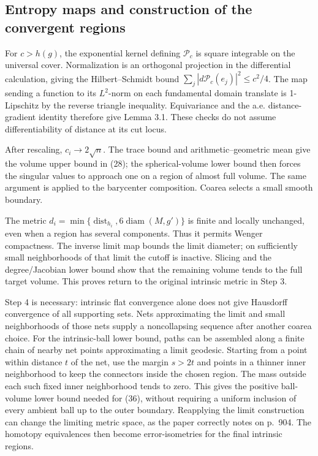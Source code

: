 \documentclass[10pt]{article}
\begin{document}
\subsection*{Entropy maps and construction of the convergent regions}
For \(c>h(g)\), the exponential kernel defining \(\mathcal P_c\) is square integrable on the universal cover. Normalization is an orthogonal projection in the differential calculation, giving the Hilbert–Schmidt bound \(\sum_j|d\mathcal P_c(e_j)|^2\leq c^2/4\). The map sending a function to its \(L^2\)-norm on each fundamental domain translate is 1-Lipschitz by the reverse triangle inequality. Equivariance and the a.e. distance-gradient identity therefore give Lemma 3.1. These checks do not assume differentiability of distance at its cut locus.\par
After rescaling, \(c_i\to2\sqrt n\). The trace bound and arithmetic–geometric mean give the volume upper bound in (28); the spherical-volume lower bound then forces the singular values to approach one on a region of almost full volume. The same argument is applied to the barycenter composition. Coarea selects a small smooth boundary.\par
The metric \(\widehat d_i=\min\{\operatorname{dist}_{h_i},6\operatorname{diam}(M,g')\}\) is finite and locally unchanged, even when a region has several components. Thus it permits Wenger compactness. The inverse limit map bounds the limit diameter; on sufficiently small neighborhoods of that limit the cutoff is inactive. Slicing and the degree/Jacobian lower bound show that the remaining volume tends to the full target volume. This proves return to the original intrinsic metric in Step 3.\par
Step 4 is necessary: intrinsic flat convergence alone does not give Hausdorff convergence of all supporting sets. Nets approximating the limit and small neighborhoods of those nets supply a noncollapsing sequence after another coarea choice. For the intrinsic-ball lower bound, paths can be assembled along a finite chain of nearby net points approximating a limit geodesic. Starting from a point within distance \(t\) of the net, use the margin \(s>2t\) and points in a thinner inner neighborhood to keep the connectors inside the chosen region. The mass outside each such fixed inner neighborhood tends to zero. This gives the positive ball-volume lower bound needed for (36), without requiring a uniform inclusion of every ambient ball up to the outer boundary. Reapplying the limit construction can change the limiting metric space, as the paper correctly notes on p. 904. The homotopy equivalences then become error-isometries for the final intrinsic regions.\par
\end{document}
